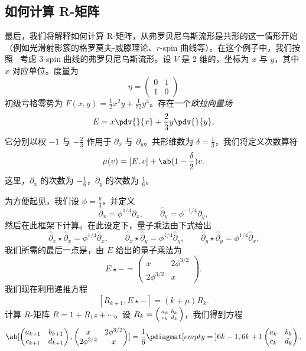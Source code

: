 \subsection{如何计算 R-矩阵}%
\label{sub:How to compute the R-matrix}

最后，我们将解释如何计算 R-矩阵，从弗罗贝尼乌斯流形是共形的这一情形开始（例如光滑射影簇的格罗莫夫-威滕理论、\(r\)-spin 曲线等）。在这个例子中，我们按照~\cite{PPZ2015} 考虑 3-spin 曲线的弗罗贝尼乌斯流形。设 \(V\) 是 2 维的，坐标为 \(x\) 与 \(y\)，其中 \(x\) 对应单位。度量为
\[ \eta = \begin{pmatrix}
    0 & 1 \\
    1 & 0
\end{pmatrix} \]
初级亏格零势为 \(F(x,y) = \frac{1}{2} x^2 y + \frac{1}{72} y^4\)。存在一个\textit{欧拉向量场}
\[ E = x \pdv{}{x} + \frac{2}{3} y \pdv{}{y}, \]
它分别以权 \(-1\) 与 \(-\frac{2}{3}\) 作用于 \(\partial_x\) 与 \(\partial_y\)。共形维数为 \(\delta = \frac{1}{3}\)，我们将定义次数算符
\[ \mu(v) = [E,v] + \ab(1 - \frac{\delta}{2})v. \]
这里，\(\partial_x\) 的次数为 \(-\frac{1}{6}\)，\(\partial_y\) 的次数为 \(\frac{1}{6}\)。

为方便起见，我们设 \(\phi = \frac{y}{3}\)，并定义
\[ \hat{\partial}_x = \phi^{1/4} \partial_x, \qquad \hat{\partial}_y = \phi^{-1/4} \partial_y, \]
然后在此框架下计算。在此设定下，量子乘法由下式给出
\[ \hat{\partial}_x \star \hat{\partial}_x = \phi^{1/4} \hat{\partial}_x, \qquad \hat{\partial}_x \star \hat{\partial}_y = \phi^{1/4} \hat{\partial}_y, \qquad \hat{\partial}_y \star \hat{\partial}_y = \phi^{1/4} \hat{\partial}_x. \]
我们所需的最后一点是，由 \(E\) 给出的量子乘法为
\[ E \star - = \begin{pmatrix}
    x & 2 \phi^{3/2} \\
    2 \phi^{3/2} & x 
\end{pmatrix}. \]
我们现在利用递推方程
\[ [R_{k+1}, E \star -] = (k + \mu) R_k. \]
计算 \(R\)-矩阵 \(R = 1 + R_1 z + \cdots\)。设 \(R_k = \begin{psmallmatrix}
    a_k & b_k \\
    c_k & d_k
\end{psmallmatrix}\)，我们得到方程
\[ \ab[
    \begin{pmatrix}
        a_{k+1} & b_{k+1} \\
        c_{k+1} & d_{k+1}
    \end{pmatrix}, \begin{pmatrix}
        x & 2 \phi^{3/2} \\
        2 \phi^{3/2} & x 
    \end{pmatrix}
] = \frac{1}{6} \pdiagmat[empty={}]{6k-1, 6k+1} \begin{pmatrix}
    a_k & b_k \\
    c_k & d_k 
\end{pmatrix}. \]

